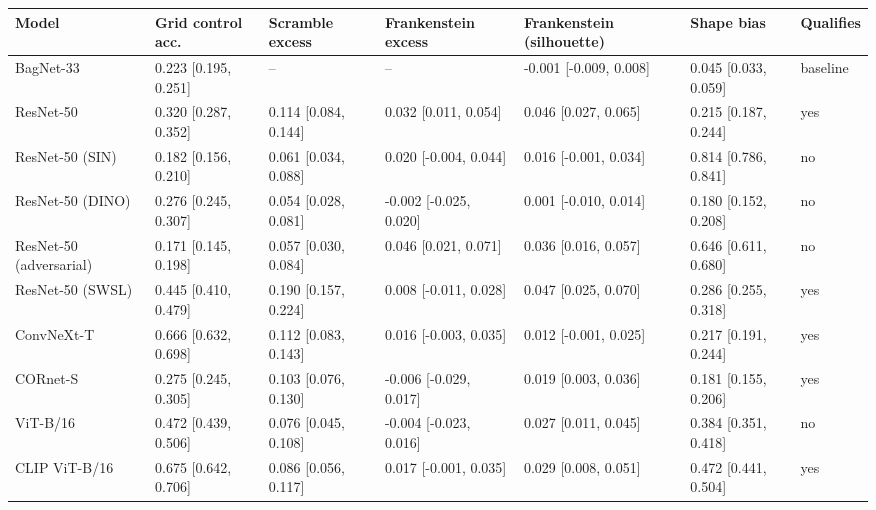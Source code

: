 \begin{tabular}{lllllll}
\hline
Model & Grid control acc. & Scramble excess & Frankenstein excess & Frankenstein (silhouette) & Shape bias & Qualifies \\
\hline
BagNet-33 & 0.223 [0.195, 0.251] & -- & -- & -0.001 [-0.009, 0.008] & 0.045 [0.033, 0.059] & baseline \\
ResNet-50 & 0.320 [0.287, 0.352] & 0.114 [0.084, 0.144] & 0.032 [0.011, 0.054] & 0.046 [0.027, 0.065] & 0.215 [0.187, 0.244] & yes \\
ResNet-50 (SIN) & 0.182 [0.156, 0.210] & 0.061 [0.034, 0.088] & 0.020 [-0.004, 0.044] & 0.016 [-0.001, 0.034] & 0.814 [0.786, 0.841] & no \\
ResNet-50 (DINO) & 0.276 [0.245, 0.307] & 0.054 [0.028, 0.081] & -0.002 [-0.025, 0.020] & 0.001 [-0.010, 0.014] & 0.180 [0.152, 0.208] & no \\
ResNet-50 (adversarial) & 0.171 [0.145, 0.198] & 0.057 [0.030, 0.084] & 0.046 [0.021, 0.071] & 0.036 [0.016, 0.057] & 0.646 [0.611, 0.680] & no \\
ResNet-50 (SWSL) & 0.445 [0.410, 0.479] & 0.190 [0.157, 0.224] & 0.008 [-0.011, 0.028] & 0.047 [0.025, 0.070] & 0.286 [0.255, 0.318] & yes \\
ConvNeXt-T & 0.666 [0.632, 0.698] & 0.112 [0.083, 0.143] & 0.016 [-0.003, 0.035] & 0.012 [-0.001, 0.025] & 0.217 [0.191, 0.244] & yes \\
CORnet-S & 0.275 [0.245, 0.305] & 0.103 [0.076, 0.130] & -0.006 [-0.029, 0.017] & 0.019 [0.003, 0.036] & 0.181 [0.155, 0.206] & yes \\
ViT-B/16 & 0.472 [0.439, 0.506] & 0.076 [0.045, 0.108] & -0.004 [-0.023, 0.016] & 0.027 [0.011, 0.045] & 0.384 [0.351, 0.418] & no \\
CLIP ViT-B/16 & 0.675 [0.642, 0.706] & 0.086 [0.056, 0.117] & 0.017 [-0.001, 0.035] & 0.029 [0.008, 0.051] & 0.472 [0.441, 0.504] & yes \\
\hline
\end{tabular}